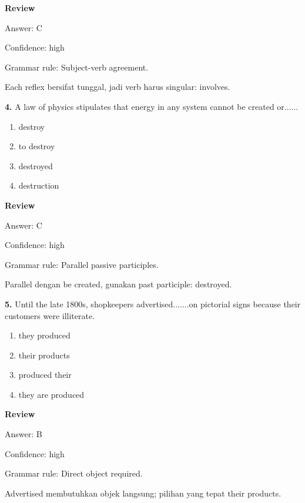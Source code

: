 \documentclass[12pt]{article}
\begin{document}
\par
\begingroup
\setlength{\parskip}{0pt}
\setlength{\parindent}{0pt}
\textbf{Review}\par
Answer: C\par
Confidence: high\par
Grammar rule: Subject-verb agreement.\par
Each reflex bersifat tunggal, jadi verb harus singular: involves.\par
\endgroup
\par
\vspace{0.25\baselineskip}
\noindent\textbf{4.} A law of physics stipulates that energy in any system cannot be created or......
\begin{enumerate}[label=(\Alph*),leftmargin=*,itemsep=0.2em]
\item destroy
\item to destroy
\item destroyed
\item destruction
\end{enumerate}
\par
\begingroup
\setlength{\parskip}{0pt}
\setlength{\parindent}{0pt}
\textbf{Review}\par
Answer: C\par
Confidence: high\par
Grammar rule: Parallel passive participles.\par
Parallel dengan be created, gunakan past participle: destroyed.\par
\endgroup
\par
\vspace{0.25\baselineskip}
\noindent\textbf{5.} Until the late 1800s, shopkeepers advertised.......on pictorial signs because their customers were illiterate.
\begin{enumerate}[label=(\Alph*),leftmargin=*,itemsep=0.2em]
\item they produced
\item their products
\item produced their
\item they are produced
\end{enumerate}
\par
\begingroup
\setlength{\parskip}{0pt}
\setlength{\parindent}{0pt}
\textbf{Review}\par
Answer: B\par
Confidence: high\par
Grammar rule: Direct object required.\par
Advertised membutuhkan objek langsung; pilihan yang tepat their products.\par
\end{document}
